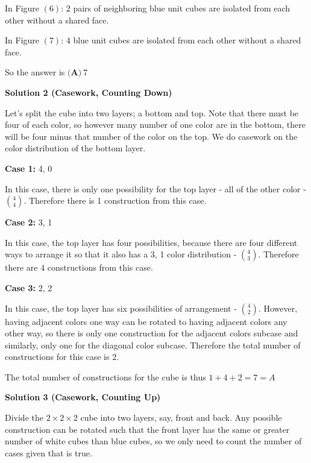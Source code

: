 \begin{enumerate}
 In Figure $(6)$: $2$ pairs of neighboring blue unit cubes are isolated from each other without a shared face.

 In Figure $(7)$: $4$ blue unit cubes are isolated from each other without a shared face.

 So the answer is $\boxed{\textbf{(A)}\ 7}$




\textbf{Solution 2 (Casework, Counting Down)}

Let’s split the cube into two layers; a bottom and top. Note that there must be four of each color, so however many number of one color are in the bottom, there will be four minus that number of the color on the top. We do casework on the color distribution of the bottom layer.

 \textbf{Case 1:} 4, 0

 In this case, there is only one possibility for the top layer - all of the other color - $\binom{4}{4}$. Therefore there is 1 construction from this case.

 \textbf{Case 2:} 3, 1

 In this case, the top layer has four possibilities, because there are four different ways to arrange it so that it also has a 3, 1 color distribution - $\binom{4}{3}$. Therefore there are 4 constructions from this case.

 \textbf{Case 3:} 2, 2

 In this case, the top layer has six possibilities of arrangement - $\binom{4}{2}$. However, having adjacent colors one way can be rotated to having adjacent colors any other way, so there is only one construction for the adjacent colors subcase and similarly, only one for the diagonal color subcase. Therefore the total number of constructions for this case is 2.

 The total number of constructions for the cube is thus $1+4+2=7=\boxed{A}$




\textbf{Solution 3 (Casework, Counting Up)}

Divide the $2 \times 2 \times 2$ cube into two layers, say, front and back. Any possible construction can be rotated such that the front layer has the same or greater number of white cubes than blue cubes, so we only need to count the number of cases given that is true.  


\end{enumerate}
